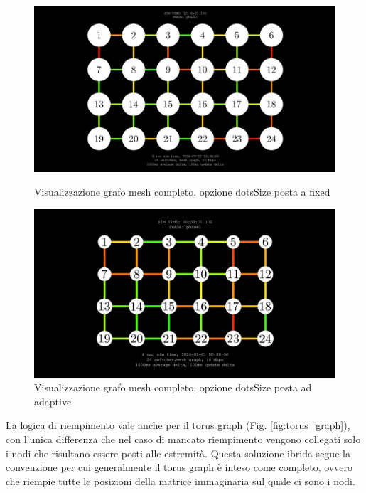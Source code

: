 \documentclass[binding=0.6cm]{sapthesis}
\begin{document}
\begin{figure}[h]
    \centering
    \begin{minipage}{0.48\textwidth}
      \includegraphics[width=\linewidth]{immagini/fixed_dots_mesh.JPG}
      \caption{Visualizzazione grafo mesh completo, opzione dotsSize posta a fixed}
      \label{fig:mesh_not_full}
    \end{minipage}\hfill
    \begin{minipage}{0.48\textwidth}
      \includegraphics[width=\linewidth]{immagini/adaptive_dots_mesh.JPG}
      \caption{Visualizzazione grafo mesh completo, opzione dotsSize posta ad adaptive}
      \label{fig:adaptive_dots_example}
    \end{minipage}
\end{figure}

La logica di riempimento vale anche per il torus graph (Fig. \ref{fig:torus_graph}), con l'unica differenza che nel caso di mancato riempimento vengono collegati solo i nodi
che risultano essere posti alle estremità. Questa soluzione ibrida segue la convenzione per cui generalmente il torus graph è inteso come completo,
ovvero che riempie tutte le posizioni della matrice immaginaria sul quale ci sono i nodi.
\end{document}
